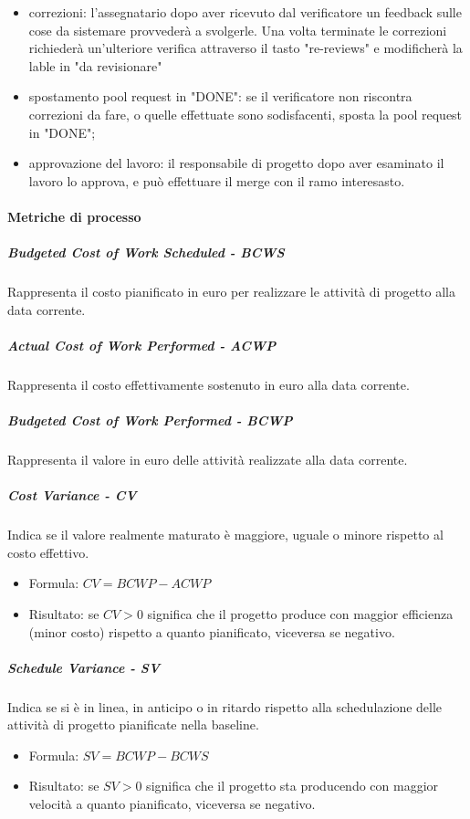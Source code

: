 \begin{itemize}
    \item correzioni: l'assegnatario dopo aver ricevuto dal verificatore un feedback sulle cose da sistemare provvederà a svolgerle. Una volta terminate le correzioni richiederà un'ulteriore verifica attraverso il tasto "re-reviews" e modificherà la lable in "da revisionare"
    \item spostamento pool request in "DONE": se il verificatore non riscontra correzioni da fare, o quelle effettuate sono sodisfacenti, sposta la pool request in "DONE";
    \item approvazione del lavoro: il responsabile di progetto dopo aver esaminato il lavoro lo approva, e può effettuare il merge con il ramo interesasto.
\end{itemize}
\paragraph{Metriche di processo}

\subparagraph{Budgeted Cost of Work Scheduled - BCWS}
Rappresenta il costo pianificato in euro per realizzare le attività di progetto alla data corrente.

\subparagraph{Actual Cost of Work Performed - ACWP}
Rappresenta il costo effettivamente sostenuto in euro alla data corrente.

\subparagraph{Budgeted Cost of Work Performed - BCWP}
Rappresenta il valore in euro delle attività realizzate alla data corrente.

\subparagraph{Cost Variance - CV}
Indica se il valore realmente maturato è maggiore, uguale o minore rispetto al costo effettivo.
\begin{itemize}
    \item Formula: $CV = BCWP - ACWP$
    \item Risultato: se $CV > 0$ significa che il progetto produce con maggior efficienza (minor costo) rispetto a quanto pianificato, viceversa se negativo.
\end{itemize}

\subparagraph{Schedule Variance - SV}
Indica se si è in linea, in anticipo o in ritardo rispetto alla schedulazione delle attività di progetto pianificate nella baseline.
\begin{itemize}
    \item Formula: $SV = BCWP - BCWS$
    \item Risultato: se $SV > 0$ significa che il progetto sta producendo con maggior velocità a quanto pianificato, viceversa se negativo.
\end{itemize}
